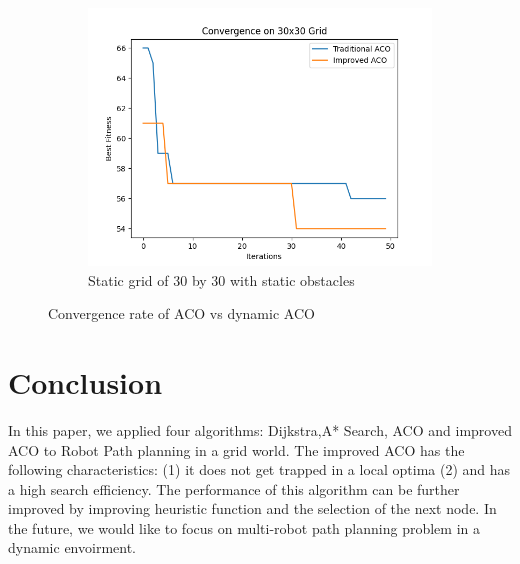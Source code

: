 \documentclass[conference]{IEEEtran}
\begin{document}
\begin{figure}[H]
     \begin{subfigure}[b]{0.4\textwidth}
     \centering
         \includegraphics[width=\textwidth]{ACO_Convergence_30x30.png} 
         \caption{Static grid of 30 by 30 with static obstacles}
         \label{fig:112}
     \end{subfigure}
     
     \caption{Convergence rate of ACO vs dynamic ACO}
    \label{fig11}
\end{figure}


\section{Conclusion}

In this paper, we applied four algorithms: Dijkstra,A* Search, ACO and improved ACO to Robot Path planning in a grid world. The improved ACO has the following characteristics: (1) it does not get trapped in a local optima (2) and has a high search efficiency. The performance of this algorithm can be further improved by improving heuristic function and the selection of the next node.
In the future, we would like to focus on multi-robot path 
planning problem in a dynamic envoirment.



\end{document}
